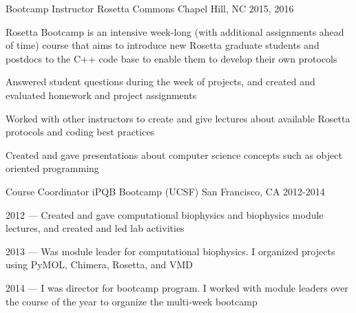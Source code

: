 

\begin{cventries}

  \cventry
  {Bootcamp Instructor} %
  {Rosetta Commons} %
  {Chapel Hill, NC} %
  {2015, 2016} %
  {
    \begin{cvitems} %
    \item Rosetta Bootcamp is an intensive week-long (with additional assignments ahead of time) course
      that aims to introduce new Rosetta graduate students and postdocs to the C++ code base
      to enable them to develop their own protocols
    \item Answered student questions during the week of projects, and created and evaluated homework and project assignments
    \item Worked with other instructors to create and give lectures about available Rosetta protocols and coding best practices
    \item Created and gave presentations about computer science concepts such as object oriented programming
    \end{cvitems}
  }

  \cventry
  {Course Coordinator} %
  {iPQB Bootcamp (UCSF)} %
  {San Francisco, CA} %
  {2012-2014} %
  {
    \begin{cvitems} %
    \item {2012 --- Created and gave computational biophysics and biophysics module lectures, and created and led lab activities}
    \item {2013 --- Was module leader for computational biophysics. I organized projects using PyMOL, Chimera, Rosetta, and VMD}
    \item {2014 --- I was director for bootcamp program. I worked with module leaders over the course of the year to organize the multi-week bootcamp}
    \end{cvitems}
  }


\end{cventries}

